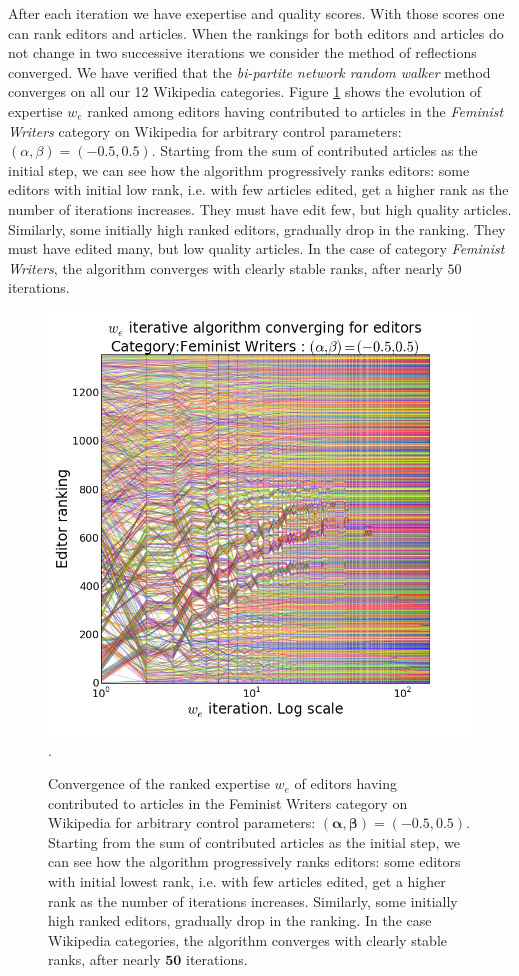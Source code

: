 After each iteration we have exepertise and quality scores. With those scores one can rank editors and articles. When the rankings for both editors and articles do not change in two successive iterations we consider the method of reflections converged. We have verified that the {\it bi-partite network random walker} method converges on all our 12 Wikipedia categories.  Figure \ref{fig:convergence} shows the evolution of expertise $w_e$ ranked among editors having contributed to articles in the {\it Feminist Writers} category on Wikipedia for arbitrary control parameters: $(\alpha,\beta) =(-0.5, 0.5)$. Starting from the sum of contributed articles as the initial step, we can see how the algorithm progressively ranks editors: some editors with initial low rank, i.e. with few articles edited, get a higher rank as the number of iterations increases. They must have edit few, but high quality articles. Similarly, some initially high ranked editors, gradually drop in the ranking. They must have edited many, but low quality articles. In the case of category {\it Feminist Writers}, the algorithm converges with clearly stable ranks, after nearly $50$ iterations.

\begin{figure}[!t]
\centering
\includegraphics[width=0.9\columnwidth]{../Figures/fem_editors_iter_converge.png}.
\caption{Convergence of the ranked expertise $w_e$ of editors having contributed to articles in the Feminist Writers category on Wikipedia for arbitrary control parameters: $\mathbf{(\alpha,\beta) =(-0.5, 0.5)}$. Starting from the sum of contributed articles as the initial step, we can see how the algorithm progressively ranks editors: some editors with initial lowest rank, i.e. with few articles edited, get a higher rank as the number of iterations increases. Similarly, some initially high ranked editors, gradually drop in the ranking. In the case Wikipedia categories, the algorithm converges with clearly stable ranks, after nearly $\mathbf{50}$ iterations.}
\label{fig:convergence}
\end{figure}


